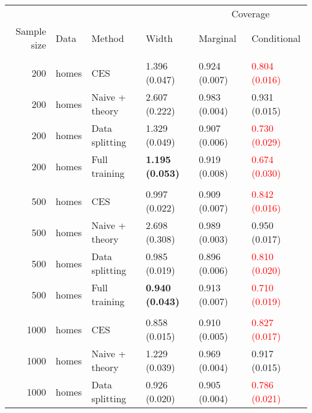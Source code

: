 
\begin{tabular}[t]{rlllll}
\toprule
\multicolumn{4}{c}{ } & \multicolumn{2}{c}{Coverage} \\
\cmidrule(l{3pt}r{3pt}){5-6}
Sample size & Data & Method & Width & Marginal & Conditional\\
\midrule
\addlinespace[0.3em]
\multicolumn{6}{l}{\textbf{200}}\\
\hspace{1em}200 & homes & CES & 1.396 (0.047) & 0.924 (0.007) & \textcolor{red}{0.804 (0.016)}\\
\hspace{1em}200 & homes & Naive + theory & 2.607 (0.222) & 0.983 (0.004) & 0.931 (0.015)\\
\hspace{1em}200 & homes & Data splitting & 1.329 (0.049) & 0.907 (0.006) & \textcolor{red}{0.730 (0.029)}\\
\hspace{1em}200 & homes & Full training & \textbf{1.195 (0.053)} & 0.919 (0.008) & \textcolor{red}{0.674 (0.030)}\\
\addlinespace[0.3em]
\multicolumn{6}{l}{\textbf{500}}\\
\hspace{1em}500 & homes & CES & 0.997 (0.022) & 0.909 (0.007) & \textcolor{red}{0.842 (0.016)}\\
\hspace{1em}500 & homes & Naive + theory & 2.698 (0.308) & 0.989 (0.003) & 0.950 (0.017)\\
\hspace{1em}500 & homes & Data splitting & 0.985 (0.019) & 0.896 (0.006) & \textcolor{red}{0.810 (0.020)}\\
\hspace{1em}500 & homes & Full training & \textbf{0.940 (0.043)} & 0.913 (0.007) & \textcolor{red}{0.710 (0.019)}\\
\addlinespace[0.3em]
\multicolumn{6}{l}{\textbf{1000}}\\
\hspace{1em}1000 & homes & CES & 0.858 (0.015) & 0.910 (0.005) & \textcolor{red}{0.827 (0.017)}\\
\hspace{1em}1000 & homes & Naive + theory & 1.229 (0.039) & 0.969 (0.004) & 0.917 (0.015)\\
\hspace{1em}1000 & homes & Data splitting & 0.926 (0.020) & 0.905 (0.004) & \textcolor{red}{0.786 (0.021)}\\

\end{tabular}
